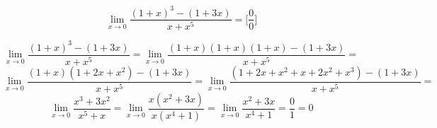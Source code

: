 {}

  $$ \lim_{x\to0}\dfrac{(1+x)^3-(1+3x)}{x+x^5} = \big[\dfrac{0}{0}\big] $$

$$
  \lim_{x\to0}\dfrac{(1+x)^3-(1+3x)}{x+x^5} =
  \lim_{x\to0}\dfrac{(1+x)(1+x)(1+x)-(1+3x)}{x+x^5} =
$$
$$
  \lim_{x\to0}\dfrac{(1+x)(1+2x+x^2)-(1+3x)}{x+x^5} =
  \lim_{x\to0}\dfrac{(1+2x+x^2+x+2x^2+x^3)-(1+3x)}{x+x^5} =
$$
$$
  \lim_{x\to0}\dfrac{x^3+3x^2}{x^5+x} =
  \lim_{x\to0}\dfrac{x(x^2+3x)}{x(x^4+1)} =
  \lim_{x\to0}\dfrac{x^2+3x}{x^4+1} =  \dfrac{0}{1} = 0
$$
